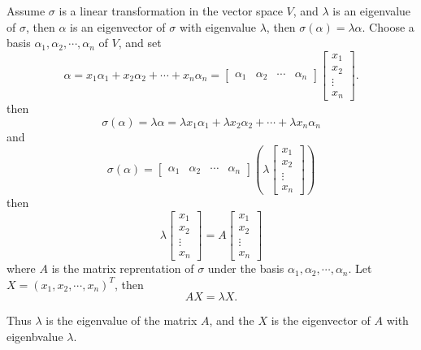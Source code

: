 \documentclass{article}
\theoremstyle{definition}
\begin{document}
Assume $\sigma$ is a linear transformation in the vector space $V$, and $\lambda$ is an eigenvalue 
of $\sigma$, then $\alpha$ is an eigenvector of $\sigma$ with eigenvalue $\lambda$, then $\sigma(\alpha)=\lambda \alpha.$
Choose a basis $\alpha_{1},\alpha_{2},\cdots,\alpha_{n}$ of $V$, and set 
$$\alpha=x_{1}\alpha_{1}+x_{2}\alpha_{2}+\cdots+x_{n}\alpha_{n}=\begin{bmatrix}\alpha_{1}&\alpha_{2}&\cdots&\alpha_{n}\end{bmatrix}
\begin{bmatrix}
    x_{1}\\
    x_{2}\\
    \vdots\\
    x_{n}
\end{bmatrix}.$$
then 
$$\sigma(\alpha)=\lambda\alpha=\lambda x_{1}\alpha_{1}+\lambda x_{2}\alpha_{2}+\cdots+\lambda x_{n}\alpha_{n}$$
and
$$\sigma(\alpha)=\begin{bmatrix}\alpha_{1}&\alpha_{2}&\cdots&\alpha_{n}\end{bmatrix}
(\lambda
\begin{bmatrix}
    x_{1}\\
    x_{2}\\
    \vdots\\
    x_{n}
\end{bmatrix})$$
then 
$$\lambda\begin{bmatrix}
    x_{1}\\
    x_{2}\\
    \vdots\\
    x_{n}
\end{bmatrix}
=
A\begin{bmatrix}
    x_{1}\\
    x_{2}\\
    \vdots\\
    x_{n}
\end{bmatrix}$$
where $A$ is the matrix reprentation of $\sigma$ under the basis $\alpha_{1},\alpha_{2},\cdots,\alpha_{n}$.
Let $X=(x_{1},x_{2},\cdots,x_{n})^{T}$, then 
$$AX=\lambda X.$$

Thus $\lambda$ is the eigenvalue of the matrix $A$, and the $X$ is the 
eigenvector of $A$ with eigenbvalue $\lambda$.
\end{document}
